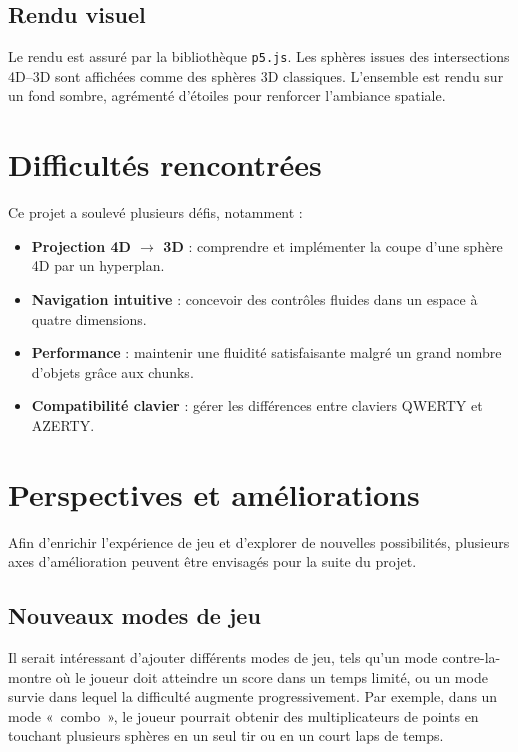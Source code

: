 \documentclass[11pt,a4paper]{article}
\begin{document}
\subsection{Rendu visuel}

Le rendu est assuré par la bibliothèque \texttt{p5.js}. Les sphères issues des intersections 4D–3D sont affichées comme des sphères 3D classiques. L’ensemble est rendu sur un fond sombre, agrémenté d’étoiles pour renforcer l’ambiance spatiale.

\section{Difficultés rencontrées}

Ce projet a soulevé plusieurs défis, notamment :
\begin{itemize}
	\item \textbf{Projection 4D $\rightarrow$ 3D} : comprendre et implémenter la coupe d’une sphère 4D par un hyperplan.
	\item \textbf{Navigation intuitive} : concevoir des contrôles fluides dans un espace à quatre dimensions.
	\item \textbf{Performance} : maintenir une fluidité satisfaisante malgré un grand nombre d’objets grâce aux chunks.
	\item \textbf{Compatibilité clavier} : gérer les différences entre claviers QWERTY et AZERTY.
\end{itemize}

\section{Perspectives et améliorations}

Afin d’enrichir l’expérience de jeu et d’explorer de nouvelles possibilités, plusieurs axes d’amélioration peuvent être envisagés pour la suite du projet.

\subsection{Nouveaux modes de jeu}

Il serait intéressant d’ajouter différents modes de jeu, tels qu’un mode contre-la-montre où le joueur doit atteindre un score dans un temps limité, ou un mode survie dans lequel la difficulté augmente progressivement. Par exemple, dans un mode « combo », le joueur pourrait obtenir des multiplicateurs de points en touchant plusieurs sphères en un seul tir ou en un court laps de temps.
\end{document}
